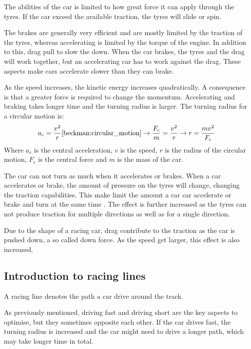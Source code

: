 The abilities of the car is limited to how great force it can apply through the tyres. If the car exceed the available traction, the tyres will slide or spin. 

The brakes are generally very efficient and are mostly limited by the traction of the tyres, whereas accelerating is limited by the torque of the engine. In addition to this, drag pull to slow the down. When the car brakes, the tyres and the drag will work together, but an accelerating car has to work against the drag. These aspects make cars accelerate slower than they can brake.

As the speed increases, the kinetic energy increases quadratically. A consequence is that a greater force is required to change the momentum. Accelerating and braking takes longer time and the turning radius is larger. The turning radius for a circular motion is:
\begin{equation}
a_c = \frac{v^2}{r} \cite{beckman:circular_motion} 
\rightarrow
\frac{F_c}{m} = \frac{v^2}{r} 
\rightarrow
r = \frac{mv^2}{F_c}
\end{equation}
Where $a_c$ is the central acceleration, $v$ is the speed, $r$ is the radius of the circular motion, $F_c$ is the central force and $m$ is the mass of the car.

The car can not turn as much when it accelerates or brakes. When a car accelerates or brake, the amount of pressure on the tyres will change, changing the traction capabilities. This make limit the amount a car car accelerate or brake and turn at the same time \cite{beckman:weight_transfer}. The effect is further increased as the tyres can not produce traction for multiple directions as well as for a single direction\cite{beckman:traction_budget}. 

Due to the shape of a racing car, drag contribute to the traction as the car is pushed down, a so called down force. As the speed get larger, this effect is also increased.


\subsection{Introduction to racing lines}
A racing line denotes the path a car drive around the track.

As previously mentioned, driving fast and driving short are the key aspects to optimise, but they sometimes opposite each other. If the car drives fast, the turning radius is increased and the car might need to drive a longer path, which may take longer time in total. 

